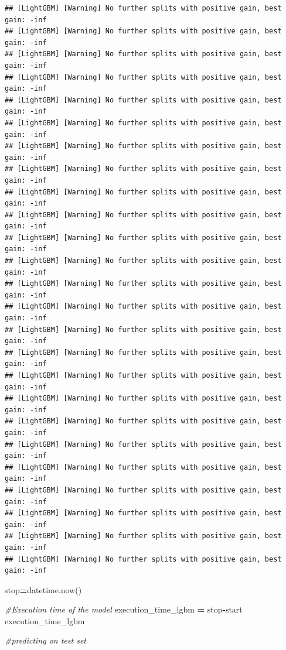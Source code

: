 \documentclass[
]{book}
\newenvironment{Shaded}{\begin{snugshade}}{\end{snugshade}}
\newcommand{\CommentTok}[1]{\textcolor[rgb]{0.56,0.35,0.01}{\textit{#1}}}
\newcommand{\NormalTok}[1]{#1}
\newcommand{\OperatorTok}[1]{\textcolor[rgb]{0.81,0.36,0.00}{\textbf{#1}}}
\begin{document}
\begin{verbatim}
## [LightGBM] [Warning] No further splits with positive gain, best gain: -inf
## [LightGBM] [Warning] No further splits with positive gain, best gain: -inf
## [LightGBM] [Warning] No further splits with positive gain, best gain: -inf
## [LightGBM] [Warning] No further splits with positive gain, best gain: -inf
## [LightGBM] [Warning] No further splits with positive gain, best gain: -inf
## [LightGBM] [Warning] No further splits with positive gain, best gain: -inf
## [LightGBM] [Warning] No further splits with positive gain, best gain: -inf
## [LightGBM] [Warning] No further splits with positive gain, best gain: -inf
## [LightGBM] [Warning] No further splits with positive gain, best gain: -inf
## [LightGBM] [Warning] No further splits with positive gain, best gain: -inf
## [LightGBM] [Warning] No further splits with positive gain, best gain: -inf
## [LightGBM] [Warning] No further splits with positive gain, best gain: -inf
## [LightGBM] [Warning] No further splits with positive gain, best gain: -inf
## [LightGBM] [Warning] No further splits with positive gain, best gain: -inf
## [LightGBM] [Warning] No further splits with positive gain, best gain: -inf
## [LightGBM] [Warning] No further splits with positive gain, best gain: -inf
## [LightGBM] [Warning] No further splits with positive gain, best gain: -inf
## [LightGBM] [Warning] No further splits with positive gain, best gain: -inf
## [LightGBM] [Warning] No further splits with positive gain, best gain: -inf
## [LightGBM] [Warning] No further splits with positive gain, best gain: -inf
## [LightGBM] [Warning] No further splits with positive gain, best gain: -inf
## [LightGBM] [Warning] No further splits with positive gain, best gain: -inf
## [LightGBM] [Warning] No further splits with positive gain, best gain: -inf
## [LightGBM] [Warning] No further splits with positive gain, best gain: -inf
## [LightGBM] [Warning] No further splits with positive gain, best gain: -inf
\end{verbatim}

\begin{Shaded}
\begin{Highlighting}[]
\NormalTok{stop}\OperatorTok{=}\NormalTok{datetime.now()}

\CommentTok{\#Execution time of the model}
\NormalTok{execution\_time\_lgbm }\OperatorTok{=}\NormalTok{ stop}\OperatorTok{{-}}\NormalTok{start}
\NormalTok{execution\_time\_lgbm}


\CommentTok{\#predicting on test set}
\end{Highlighting}
\end{Shaded}
\end{document}
